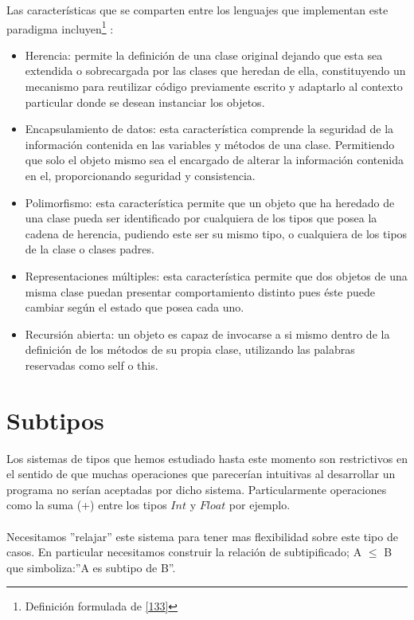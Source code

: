 \bigskip

Las características que se comparten entre los lenguajes que implementan este paradigma incluyen\footnote{Definición formulada de \hyperlink{133}{[133]}} :
\bigskip

\begin{itemize}
    \item Herencia:
	 permite la definición de una clase original dejando que esta sea extendida o sobrecargada por las clases que heredan de ella, constituyendo un mecanismo para reutilizar código previamente escrito y adaptarlo al contexto particular donde se desean instanciar los objetos.\\

    \item Encapsulamiento de datos: esta característica comprende la seguridad de la información contenida en las variables y métodos de una clase. Permitiendo que solo el objeto mismo sea el encargado de alterar la información contenida en el, proporcionando seguridad y consistencia.\\

    \item  Polimorfismo: esta característica permite que un objeto que ha heredado de una clase pueda ser identificado por cualquiera de los tipos que posea la cadena de herencia, pudiendo este ser su mismo tipo, o cualquiera de los tipos de la clase o clases padres.\\

    \item  Representaciones múltiples: esta característica permite que dos objetos de una misma clase puedan presentar comportamiento distinto pues éste puede cambiar según el estado que posea cada uno.\\

    \item Recursión abierta: un objeto es capaz de invocarse a si mismo dentro de la definición de los métodos de su propia clase, utilizando las palabras reservadas como \textsf{self} o \textsf{this}.
\end{itemize}


\section{Subtipos}

Los sistemas de tipos que hemos estudiado hasta este momento son restrictivos en el sentido de que muchas operaciones que parecerían intuitivas al desarrollar un programa no serían aceptadas por dicho sistema.
Particularmente operaciones como la suma (+) entre los tipos $Int$ y $Float$ por ejemplo.\\\\
Necesitamos ''relajar'' este sistema para tener mas flexibilidad sobre este tipo de casos. En particular necesitamos construir la relación de subtipificado; A $\leq$ B que simboliza:''A es subtipo de B''.

